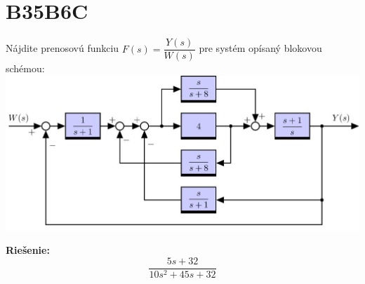 \documentclass[a4paper, 12pt]{article}
\newenvironment{task}{}{}
\newenvironment{solution}{\noindent\textbf{Riešenie:}}{}
\begin{document}
\section*{B35B6C}
\begin{task}
    Nájdite prenosovú funkciu $F(s)=\dfrac{Y(s)}{W(s)}$ pre systém opísaný blokovou schémou: \\ 

    \includegraphics{zadanie99/images/blokovka02_00004.jpg} 
\end{task} 

\begin{solution}
    \begin{equation*}
        \dfrac{5s+32}{10s^2+45s+32}
    \end{equation*}
\end{solution}
\end{document}
